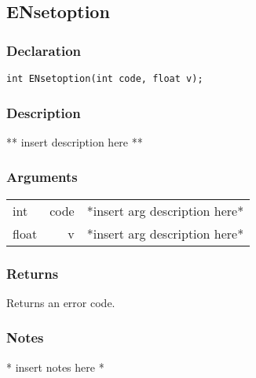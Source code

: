 \subsection{ENsetoption}
\subsubsection{Declaration}
\begin{lstlisting}
int ENsetoption(int code, float v);
\end{lstlisting}
\subsubsection{Description}
** insert description here **
\subsubsection{Arguments}
\begin{tabular}{l r p{11cm} }
int&code&*insert arg description here* \\[6pt]
float&v&*insert arg description here* \\[6pt]
\end{tabular}
\subsubsection{Returns}
Returns an error code.
\subsubsection{Notes}
* insert notes here *